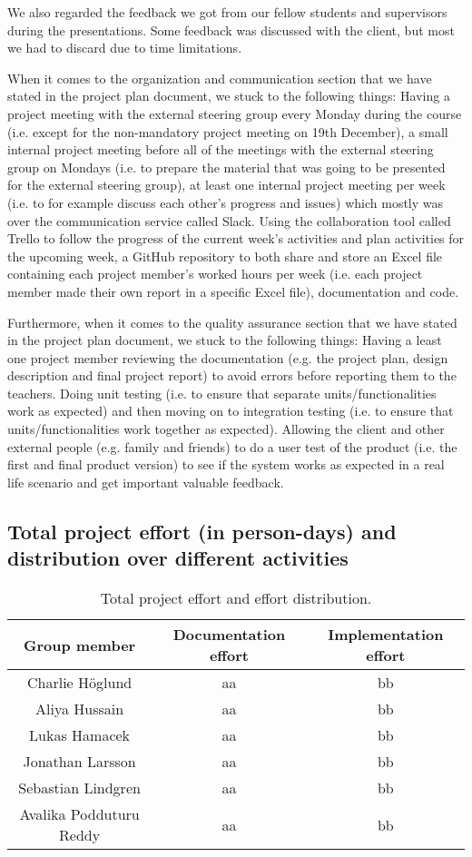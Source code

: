 \documentclass[]{article}
\begin{document}
We also regarded the feedback we got from our fellow students and supervisors during the presentations. Some feedback was discussed with the client, but most we had to discard due to time limitations.


When it comes to the organization and communication section that we have stated in the project plan document, we stuck to the following things: Having a project meeting with the external steering group every Monday during the course (i.e. except for the non-mandatory project meeting on 19th December), a small internal project meeting before all of the meetings with the external steering group on Mondays (i.e. to prepare the material that was going to be presented for the external steering group), at least one internal project meeting per week (i.e. to for example discuss each other’s progress and issues) which mostly was over the communication service called Slack. Using the collaboration tool called Trello to follow the progress of the current week’s activities and plan activities for the upcoming week, a GitHub repository to both share and store an Excel file containing each project member’s worked hours per week (i.e. each project member made their own report in a specific Excel file), documentation and code.  

Furthermore, when it comes to the quality assurance section that we have stated in the project plan document, we stuck to the following things: Having a least one project member reviewing the documentation (e.g. the project plan, design description and final project report) to avoid errors before reporting them to the teachers. Doing unit testing (i.e. to ensure that separate units/functionalities work as expected) and then moving on to integration testing (i.e. to ensure that units/functionalities work together as expected). Allowing the client and other external people (e.g. family and friends) to do a user test of the product (i.e. the first and final product version) to see if the system works as expected in a real life scenario and get important valuable feedback. 

\subsection{Total project effort (in person-days) and distribution over different activities }

\begin{table}[H]
	\centering
	\label{tab:table1}
	\begin{tabular}{ccc}
		\toprule
		Group member & Documentation effort & Implementation effort \\
		\midrule
		Charlie Höglund & aa & bb \\
		Aliya Hussain & aa & bb \\
		Lukas Hamacek & aa & bb \\
		Jonathan Larsson & aa & bb \\
		Sebastian Lindgren & aa & bb \\
		Avalika Podduturu Reddy & aa & bb \\
		\bottomrule
	\end{tabular}
	\caption{Total project effort and effort distribution.}
\end{table}
\end{document}
